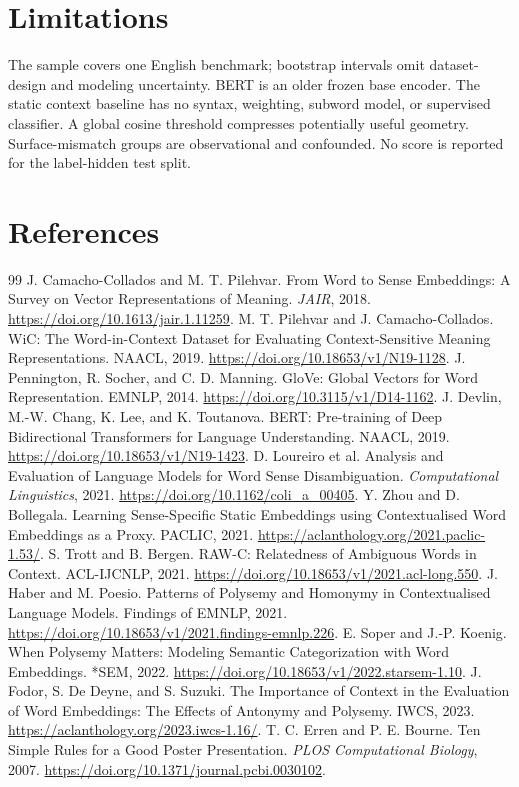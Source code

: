 \documentclass[11pt]{article}
\begin{document}
\section{Limitations}
The sample covers one English benchmark; bootstrap intervals omit dataset-design
and modeling uncertainty. BERT is an older frozen base encoder. The static
context baseline has no syntax, weighting, subword model, or supervised
classifier. A global cosine threshold compresses potentially useful geometry.
Surface-mismatch groups are observational and confounded. No score is reported
for the label-hidden test split.

\section{References}
\begin{thebibliography}{99}
 J. Camacho-Collados and M. T. Pilehvar. From Word to Sense
Embeddings: A Survey on Vector Representations of Meaning. \emph{JAIR}, 2018.
\url{https://doi.org/10.1613/jair.1.11259}.
 M. T. Pilehvar and J. Camacho-Collados. WiC: The Word-in-Context
Dataset for Evaluating Context-Sensitive Meaning Representations. NAACL, 2019.
\url{https://doi.org/10.18653/v1/N19-1128}.
 J. Pennington, R. Socher, and C. D. Manning. GloVe: Global Vectors
for Word Representation. EMNLP, 2014.
\url{https://doi.org/10.3115/v1/D14-1162}.
 J. Devlin, M.-W. Chang, K. Lee, and K. Toutanova. BERT:
Pre-training of Deep Bidirectional Transformers for Language Understanding.
NAACL, 2019. \url{https://doi.org/10.18653/v1/N19-1423}.
 D. Loureiro et al. Analysis and Evaluation of Language Models
for Word Sense Disambiguation. \emph{Computational Linguistics}, 2021.
\url{https://doi.org/10.1162/coli_a_00405}.
 Y. Zhou and D. Bollegala. Learning Sense-Specific Static Embeddings
using Contextualised Word Embeddings as a Proxy. PACLIC, 2021.
\url{https://aclanthology.org/2021.paclic-1.53/}.
 S. Trott and B. Bergen. RAW-C: Relatedness of Ambiguous Words in
Context. ACL-IJCNLP, 2021. \url{https://doi.org/10.18653/v1/2021.acl-long.550}.
 J. Haber and M. Poesio. Patterns of Polysemy and Homonymy in
Contextualised Language Models. Findings of EMNLP, 2021.
\url{https://doi.org/10.18653/v1/2021.findings-emnlp.226}.
 E. Soper and J.-P. Koenig. When Polysemy Matters: Modeling
Semantic Categorization with Word Embeddings. *SEM, 2022.
\url{https://doi.org/10.18653/v1/2022.starsem-1.10}.
 J. Fodor, S. De Deyne, and S. Suzuki. The Importance of Context in
the Evaluation of Word Embeddings: The Effects of Antonymy and Polysemy. IWCS,
2023. \url{https://aclanthology.org/2023.iwcs-1.16/}.
 T. C. Erren and P. E. Bourne. Ten Simple Rules for a Good Poster
Presentation. \emph{PLOS Computational Biology}, 2007.
\url{https://doi.org/10.1371/journal.pcbi.0030102}.
\end{thebibliography}

\clearpage

\end{document}
